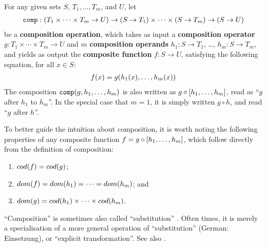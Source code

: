 \begin{definition} \label{def:composition-operation} For any given sets $S$,
$T_1, \ldots, T_m$, and $U$, let\begin{align*}
%
\mathtt{comp} : \p{T_1 \times \cdots \times T_m \rightarrow U} \rightarrow \p{S
\rightarrow T_1} \times \cdots \times \p{S \rightarrow T_m} \rightarrow \p{S
\rightarrow U}
%
\end{align*}be a \textbf{composition operation}, which takes as input a
\textbf{composition operator} $g : T_1 \times \cdots \times T_m \rightarrow U$
and $m$ \textbf{composition operands} $h_1 : S \rightarrow T_1$, \ldots, $h_m :
S \rightarrow T_m$, and yields as output the \textbf{composite function} $f : S
\rightarrow U$, satisfying the following equation, for all $x \in
S$:\begin{align*}
%
f\p{x} = g\p{h_1\p{x}, \ldots, h_m\p{x}}
%
\end{align*} The composition $\mathtt{comp}{\mathopen{}\left({g,h_1, \ldots, h_m}\right)\mathclose{}}$ is also
written as $g \circ \mathopen{}\left[{h_1, \ldots, h_m}\right]\mathclose{}$, read as ``$g$ after $h_1$ to
$h_m$''. In the special case that $m=1$, it is simply written $g \circ h$, and
read ``$g$ after $h$''.\end{definition}

To better guide the intuition about composition, it is worth noting the
following properties of any composite function $f = g \circ \mathopen{}\left[{h_1, \ldots,
h_m}\right]\mathclose{}$, which follow directly from the definition of composition:

\begin{enumerate}

\item $cod{\mathopen{}\left({f}\right)\mathclose{}} = cod{\mathopen{}\left({g}\right)\mathclose{}}$;

\item $dom{\mathopen{}\left({f}\right)\mathclose{}} = dom{\mathopen{}\left({h_1}\right)\mathclose{}} = \cdots = dom{\mathopen{}\left({h_m}\right)\mathclose{}}$; and

\item $dom{\mathopen{}\left({g}\right)\mathclose{}} = cod{\mathopen{}\left({h_1}\right)\mathclose{}} \times \cdots \times cod{\mathopen{}\left({h_m}\right)\mathclose{}}$.

\end{enumerate}

\begin{remark} ``Composition'' is sometimes also called ``substitution''
\cite{kleene-1936, robinson-1947}. Often times, it is merely a specialisation
of a more general operation of ``substitution'' (German:
Einsetzung)\cite{goedel-1931, peter-1935}, or ``explicit
transformation''\cite{smullyan-1961}.  See also
.\end{remark}

